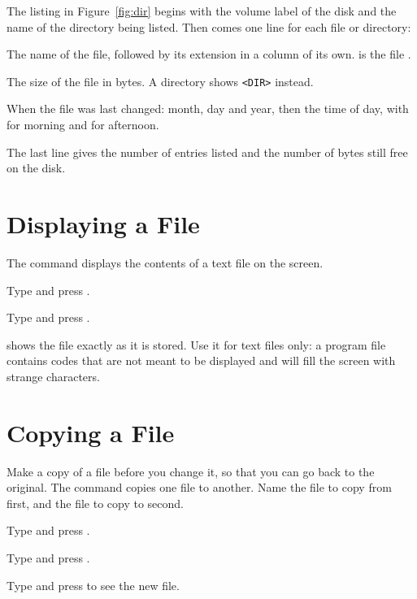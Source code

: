 
The listing in Figure~\ref{fig:dir} begins with the volume label of the disk
and the name of the directory being listed.  Then comes one line for each
file or directory:

The name of the file, followed by its extension in a column of
its own.   is the file .

The size of the file in bytes.  A directory shows
\texttt{<DIR>} instead.

When the file was last changed: month, day and
year, then the time of day, with  for morning and  for
afternoon.

The last line gives the number of entries listed and the number of bytes
still free on the disk.

\section{Displaying a File}
The  command displays the contents of a text file on the
screen.
\begin{Steps}
\item Type  and press .
\item Type  and press .
\end{Steps}


 shows the file exactly as it is stored.  Use it for text files
only: a program file contains codes that are not meant to be displayed and
will fill the screen with strange characters.

\section{Copying a File}
Make a copy of a file before you change it, so that you can go back to the
original.  The  command copies one file to another.  Name the file
to copy from first, and the file to copy to second.
\begin{Steps}
\item Type  and press .
\item Type  and press .
\item Type  and press  to see the new file.
\end{Steps}

